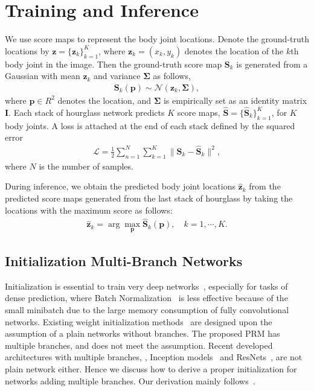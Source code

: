 \documentclass[10pt,twocolumn,letterpaper]{article}
\newcommand{\bS}{\mathbf{S}}
\newcommand{\bz}{\mathbf{z}}
\begin{document}
\section{Training and Inference}
We use score maps to represent the body joint locations. Denote the ground-truth locations by $ \mathbf{z} = \{\bz_k \}_{k=1}^K$, where $\bz_k=(x_k, y_k)$ denotes the location of the $k$th body joint in the image. Then the ground-truth score map $\bS_k$ is generated from a Gaussian with mean $\bz_k$ and variance $\boldsymbol\Sigma$ as follows,
{\small
\begin{align}
\mathbf{S}_k(\mathbf{p}) \sim \mathcal{N}(\mathbf{z}_k, \boldsymbol\Sigma),
\end{align}
}
\!\!where $\mathbf{p}\in R^2$ denotes the location, and $\boldsymbol\Sigma$ is empirically set as an identity matrix $\textbf{I}$. Each stack of hourglass network predicts $K$ score maps, \ie $\mathbf{\hat{S}} = \{\mathbf{\hat{S}}_k\}_{k=1}^K$, for $K$ body joints. A loss is attached at the end of each stack defined by the squared error
{\small
\begin{align}
\mathcal{L} = \frac{1}{2} \sum_{n=1}^N \sum_{k=1}^{K} \|\mathbf{S}_k - \mathbf{\hat{S}}_k\|^2,
\end{align}
}
\!\!where $N$ is the number of samples.

During inference, we obtain the predicted body joint locations $\hat{\bz}_k$ from the predicted score maps generated from the last stack of hourglass by taking the locations with the maximum score as follows:
{\small
\begin{align}
\hat{\bz}_k = \arg \max_{\mathbf{p}} \mathbf{\hat{S}}_k(\mathbf{p}), \quad k = 1, \cdots, K.
\end{align}
}

\vspace{-1em}
\subsection{Initialization Multi-Branch Networks}




Initialization is essential to train very deep networks~\cite{glorot2010understanding,simonyan2014very,he2015delving}, especially for tasks of dense prediction, where Batch Normalization~\cite{ioffe2015batch} is less effective because of the small minibatch due to the large memory consumption of fully convolutional networks.  
Existing weight initialization methods~\cite{krizhevsky2012imagenet,glorot2010understanding,he2015delving} are designed upon the assumption of a plain networks without branches. 
The proposed PRM has multiple branches, and does not meet the assumption. 
Recent developed architectures with multiple branches, \eg, Inception models~\cite{szegedy2015going,ioffe2015batch,szegedy2016rethinking,szegedy2016inception} and ResNets~\cite{he2016deep,he2016identity}, are not plain network either. 
Hence we discuss how to derive a proper initialization for networks adding multiple branches. 
Our derivation mainly follows~\cite{glorot2010understanding,he2015delving}. 
\end{document}
